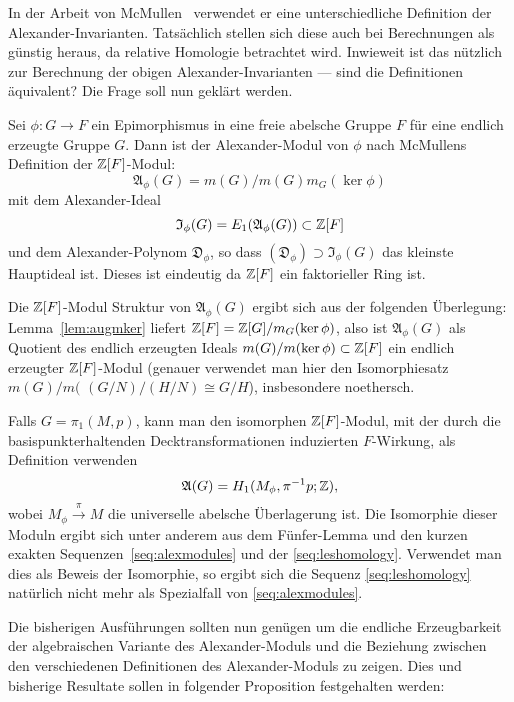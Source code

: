 In der Arbeit von McMullen~\cite{MCMULLEN.2002} verwendet er eine unterschiedliche Definition der Alexander-Invarianten. Tatsächlich stellen sich diese auch bei Berechnungen als günstig heraus, da relative Homologie betrachtet wird. Inwieweit ist das nützlich zur Berechnung der obigen Alexander-Invarianten --- sind die Definitionen äquivalent? Die Frage soll nun geklärt werden.

\begin{defn}
\label{def:Mcmullen}
	Sei $\phi: G \to F$ ein Epimorphismus in eine freie abelsche Gruppe $F$ für eine endlich erzeugte Gruppe $G$. Dann ist der Alexander-Modul von $\phi$ nach McMullens Definition der $\mathbb{Z}[F]$-Modul:
	\[
		\mathfrak A_\phi(G) = m(G)/m(G)m_G(\ker\phi)
	\]
	mit dem Alexander-Ideal
	\[
		\mathfrak I_\phi(G) = E_1 (\mathfrak A_\phi(G)) \subset \mathbb{Z}[F]
	\]
	und dem Alexander-Polynom $\mathfrak D_\phi$, so dass $(\mathfrak D_\phi ) \supset \mathfrak I_\phi(G)$ das kleinste Hauptideal ist. Dieses ist eindeutig da $\mathbb{Z}[F]$ ein faktorieller Ring ist.

\begin{bem}
\label{bem:alexmcmendlerz}
Die $\mathbb{Z}[F]$-Modul Struktur von $\mathfrak A_\phi(G)$ ergibt sich aus der folgenden Überlegung: Lemma~\ref{lem:augmker} liefert $\mathbb{Z}[F]=\mathbb{Z}[G]/m_G(\ker\phi)$, also ist $\mathfrak A_\phi(G)$ als Quotient des endlich erzeugten Ideals $m(G)/m(\ker\phi) \subset \mathbb{Z}[ F]$ ein endlich erzeugter $\mathbb{Z} [F]$-Modul (genauer verwendet man hier den Isomorphiesatz $m(G)/m($ $(G/N)/(H/N)\cong G/H$), insbesondere noethersch.
\end{bem}

	Falls $G=\pi_1(M,p)$, kann man den isomorphen $\mathbb{Z}[F]$-Modul, mit der durch die basispunkterhaltenden Decktransformationen induzierten $F$-Wirkung, als Definition verwenden
	\[
		\mathfrak A(G)= H_1(M_\phi,\pi^{-1}p;\mathbb{Z}),
	\]
	wobei $M_\phi \stackrel \pi \to M$ die universelle abelsche Überlagerung ist. Die Isomorphie dieser Moduln ergibt sich unter anderem aus dem Fünfer-Lemma und den kurzen exakten Sequenzen~\eqref{seq:alexmodules} und der \eqref{seq:leshomology}. Verwendet man dies als Beweis der Isomorphie, so ergibt sich die Sequenz \eqref{seq:leshomology} natürlich nicht mehr als Spezialfall von \eqref{seq:alexmodules}.
\end{defn}


Die bisherigen Ausführungen sollten nun genügen um die endliche Erzeugbarkeit der algebraischen Variante des Alexander-Moduls und die Beziehung zwischen den verschiedenen Definitionen des Alexander-Moduls zu zeigen. Dies und bisherige Resultate sollen in folgender Proposition festgehalten werden:

